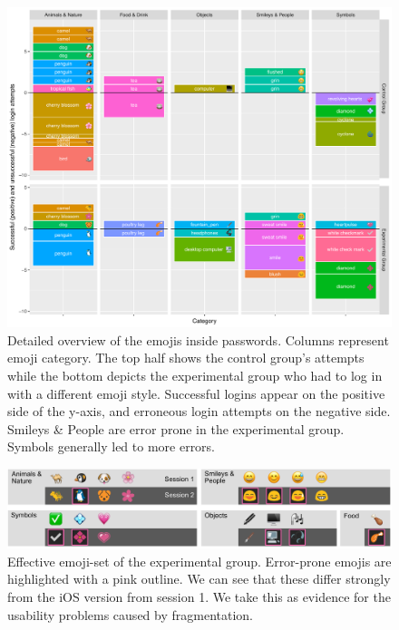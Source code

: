 \begin{figure}
	\centering
	\includegraphics[width=\linewidth]{figures/emojipasswords/success-vs-failures}
	\caption{
		\label{fig:emojipasswords:success-vs-failures}
		Detailed overview of the emojis inside passwords. Columns represent emoji category. The top half shows the control group's attempts while the bottom depicts the experimental group who had to log in with a different emoji style. Successful logins appear on the positive side of the y-axis, and erroneous login attempts on the negative side. Smileys \& People are error prone in the experimental group. Symbols generally led to more errors. 
	}
\end{figure}

\begin{figure}
	\centering
	\includegraphics[width=\linewidth]{figures/emojipasswords/experimental-group-errors}
	\caption{
		\label{fig:emojipasswords:experimental-group-failures}
		Effective emoji-set of the experimental group. Error-prone emojis are highlighted with a pink outline. We can see that these differ strongly from the iOS version from session 1. We take this as evidence for the usability problems caused by fragmentation.
	}
\end{figure}


